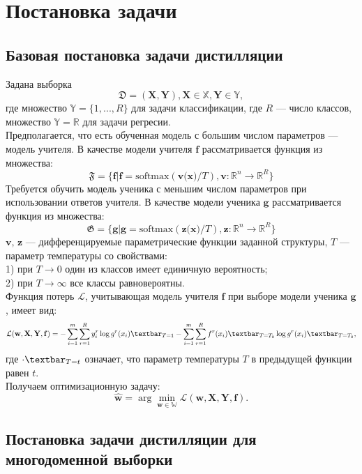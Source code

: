 \newpage

\section{Постановка задачи}

\subsection{Базовая постановка задачи дистилляции}

Задана выборка 
$$\mathfrak{D}=(\textbf{X},\textbf{Y}), \textbf{X} \in \mathbb{X}, \textbf{Y} \in \mathbb{Y},$$
где множество $\mathbb{Y}=\{1,...,R\}$ для задачи классификации, где $R$ --- число классов, множество $\mathbb{Y}=\mathbb{R}$ для задачи регресии.\\
Предполагается, что есть обученная модель с большим числом параметров --- модель учителя. В качестве модели учителя $\textbf{f}$ рассматривается функция из множества: $$\mathfrak{F}=\{\textbf{f}|\textbf{f}=\text{softmax}(\textbf{v(x)}/T), \textbf{v}:\mathbb{R}^{n}\rightarrow \mathbb{R}^{R}\}$$
Требуется обучить модель ученика с меньшим числом параметров при использовании ответов учителя. В качестве модели ученика $\textbf{g}$ рассматривается функция из множества: $$\mathfrak{G}=\{\textbf{g}|\textbf{g}=\text{softmax}(\textbf{z(x)}/T), \textbf{z}:\mathbb{R}^{n}\rightarrow \mathbb{R}^{R}\}$$
$\textbf{v, z}$ --- дифференцируемые параметрические функции заданной структуры, $T$ --- параметр температуры со свойствами:\\
1) при $T \rightarrow 0$ один из классов имеет единичную вероятность;\\ 
2) при $T \rightarrow \infty$ все классы равновероятны.\\
Функция потерь $\mathcal{L}$, учитывающая модель учителя $\textbf{f}$ при выборе модели ученика $\textbf{g}$, имеет вид: $$\mathcal{L}(\mathbf{w,X,Y,f})=-\sum\limits_{i=1}^{m}\sum\limits_{r=1}^{R}y_{i}^{r}\log{g^{r}(x_{i})}\textbar_{T=1}-\sum\limits_{i=1}^{m}\sum\limits_{r=1}^{R}f^{r}(x_{i})\textbar_{T=T_{0}}\log{g^{r}(x_{i})}\textbar_{T=T_{0}},$$
где $\cdot\textbar_{T=t}$ означает, что параметр температуры $T$ в предыдущей функции равен $t$.\\
Получаем оптимизационную задачу:
$$\hat{\mathbf{w}} = \arg\min_{\mathbf{w} \in \mathbb{W}} \mathcal{L}(\mathbf{w,X,Y,f}).$$


\subsection{Постановка задачи дистилляции для многодоменной выборки}

